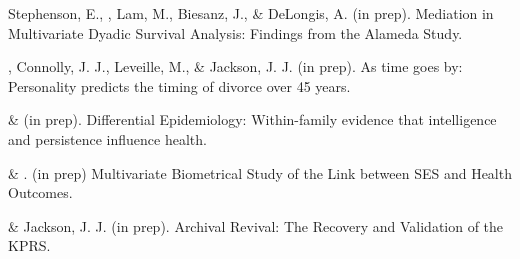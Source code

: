 \item Stephenson, E., \meb, Lam, M., Biesanz, J., \& DeLongis, A. (in prep). Mediation in Multivariate Dyadic Survival Analysis: Findings from the Alameda Study. %
\item\meb, Connolly, J. J., Leveille, M., \& Jackson, J. J. (in prep). As time goes by: Personality predicts the timing of divorce over 45 years. %
\item \meb \& \Joe (in prep). Differential Epidemiology: Within-family evidence that intelligence and persistence influence health.
\item \meb \& \joe. (in prep) Multivariate Biometrical Study of the Link between SES and Health Outcomes.
\item \meb \& Jackson, J. J. (in prep). Archival Revival: The Recovery and Validation of the KPRS.
\vspace{-2mm}\begin{center}\end{center} \vspace{-4mm}